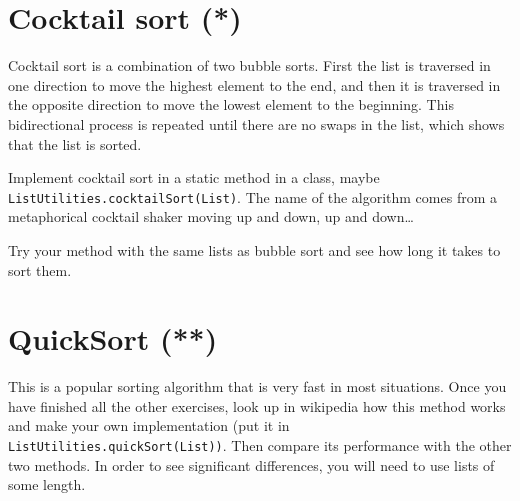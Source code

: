 \documentclass{article}
\begin{document}
\section{Cocktail sort (*)}
\label{sec:cocktail-sort}

Cocktail sort is a combination of two bubble sorts. First the list is
traversed in one direction to move the highest element to the end, and
then it is traversed in the opposite direction to move the lowest
element to the beginning. This bidirectional process is repeated until
there are no swaps in the list, which shows that the list is sorted. 

Implement cocktail sort in a static method in a class, maybe
\verb+ListUtilities.cocktailSort(List)+. The name of the algorithm comes
from a metaphorical cocktail shaker moving up and down, up and
down\ldots 

Try your method with the same lists as bubble sort 
and see how long it takes to sort them. 

\section{QuickSort (**)}
\label{sec:quicksort-}

This is a popular sorting algorithm that is very fast in most
situations. Once you have finished all the other exercises, look up in
wikipedia how this method works and make your own implementation (put
it in \verb+ListUtilities.quickSort(List))+. Then compare its
performance with the other two methods. In order to see significant
differences, you will need to use lists of some length. 
\end{document}
